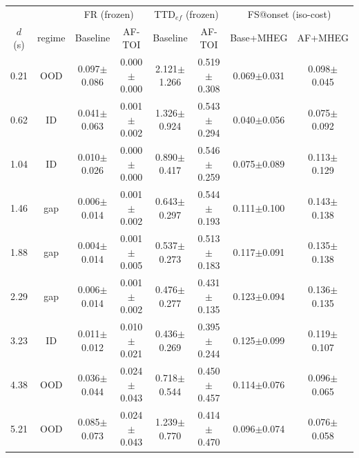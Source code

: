 \begin{tabular}{cc cc cc cc}
\toprule
& & \multicolumn{2}{c}{FR (frozen)} & \multicolumn{2}{c}{TTD$_{ef}$ (frozen)} & \multicolumn{2}{c}{FS@onset (iso-cost)} \\
\cmidrule(lr){3-4}\cmidrule(lr){5-6}\cmidrule(lr){7-8}
$d$ (s) & regime & Baseline & AF-TOI & Baseline & AF-TOI & Base+MHEG & AF+MHEG \\
\midrule
0.21 & OOD & 0.097$\pm$0.086 & 0.000$\pm$0.000 & 2.121$\pm$1.266 & 0.519$\pm$0.308 & 0.069$\pm$0.031 & 0.098$\pm$0.045 \\
0.62 & ID & 0.041$\pm$0.063 & 0.001$\pm$0.002 & 1.326$\pm$0.924 & 0.543$\pm$0.294 & 0.040$\pm$0.056 & 0.075$\pm$0.092 \\
1.04 & ID & 0.010$\pm$0.026 & 0.000$\pm$0.000 & 0.890$\pm$0.417 & 0.546$\pm$0.259 & 0.075$\pm$0.089 & 0.113$\pm$0.129 \\
1.46 & gap & 0.006$\pm$0.014 & 0.001$\pm$0.002 & 0.643$\pm$0.297 & 0.544$\pm$0.193 & 0.111$\pm$0.100 & 0.143$\pm$0.138 \\
1.88 & gap & 0.004$\pm$0.014 & 0.001$\pm$0.005 & 0.537$\pm$0.273 & 0.513$\pm$0.183 & 0.117$\pm$0.091 & 0.135$\pm$0.138 \\
2.29 & gap & 0.006$\pm$0.014 & 0.001$\pm$0.002 & 0.476$\pm$0.277 & 0.431$\pm$0.135 & 0.123$\pm$0.094 & 0.136$\pm$0.135 \\
3.23 & ID & 0.011$\pm$0.012 & 0.010$\pm$0.021 & 0.436$\pm$0.269 & 0.395$\pm$0.244 & 0.125$\pm$0.099 & 0.119$\pm$0.107 \\
4.38 & OOD & 0.036$\pm$0.044 & 0.024$\pm$0.043 & 0.718$\pm$0.544 & 0.450$\pm$0.457 & 0.114$\pm$0.076 & 0.096$\pm$0.065 \\
5.21 & OOD & 0.085$\pm$0.073 & 0.024$\pm$0.043 & 1.239$\pm$0.770 & 0.414$\pm$0.470 & 0.096$\pm$0.074 & 0.076$\pm$0.058 \\
\bottomrule
\end{tabular}
